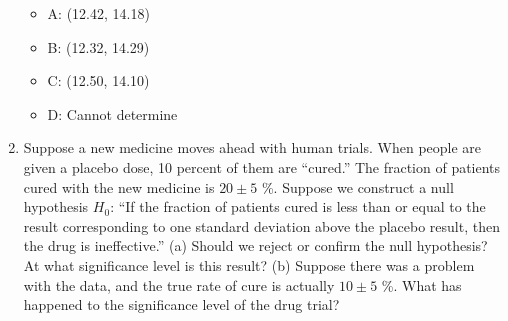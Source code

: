 \documentclass{article}
\begin{document}
\begin{enumerate}
\begin{itemize}
\item A: (12.42, 14.18)
\item B: (12.32, 14.29)
\item C: (12.50, 14.10)
\item D: Cannot determine
\end{itemize}
\item Suppose a new medicine moves ahead with human trials.  When people are given a placebo dose, 10 percent of them are ``cured.''  The fraction of patients cured with the new medicine is $20 \pm 5$ \%.  Suppose we construct a null hypothesis $H_0$: ``If the fraction of patients cured is less than or equal to the result corresponding to one standard deviation above the placebo result, then the drug is ineffective.''  (a) Should we reject or confirm the null hypothesis?  At what significance level is this result? (b) Suppose there was a problem with the data, and the true rate of cure is actually $10 \pm 5$ \%.  What has happened to the significance level of the drug trial?
\end{enumerate}
\end{document}
